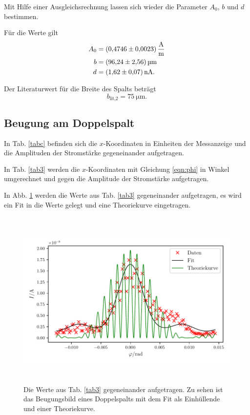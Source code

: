 \noindent Mit Hilfe einer Ausgleichsrechnung lassen sich wieder die Parameter $A_0$, $b$ und $d$ bestimmen. 

\noindent Für die Werte gilt
\begin{align*}
    A_0 &= \SI{0.4746 (023)}{\ampere\per\meter} \\
    b &= \SI{96.24 \pm 2.56}{\micro\meter} \\
    d &= \SI{1.62(07)}{\nano\ampere}. 
\end{align*}

\noindent Der Literaturwert für die Breite des Spalts beträgt
\begin{equation*}
    b_\text{lit,2} = \SI{75}{\micro\meter}.
\end{equation*}


\subsection{Beugung am Doppelspalt}
In Tab. \ref{tabc} befinden sich  die $x$-Koordinaten in Einheiten der Messanzeige und die Amplituden der Stromstärke gegeneinander aufgetragen. 



\noindent In Tab. \ref{tab3} werden die $x$-Koordinaten mit Gleichung \eqref{eqn:phi} in Winkel umgerechnet und gegen die Amplitude der Stromstärke aufgetragen. 



\noindent In Abb. \ref{fig:plot4} werden die Werte aus Tab. \ref{tab3} gegeneinander aufgetragen, es wird ein Fit in die Werte gelegt
und eine Theoriekurve eingetragen. 

\begin{figure}
    \centering
    \includegraphics[width=15cm, height=9cm]{build/plot4.pdf}
    \caption{Die Werte aus Tab. \ref{tab3} gegeneinander aufgetragen.
    Zu sehen ist das Beugungsbild eines Doppelspalts mit dem Fit
    als Einhüllende und einer Theoriekurve.}
    \label{fig:plot4}
\end{figure}


